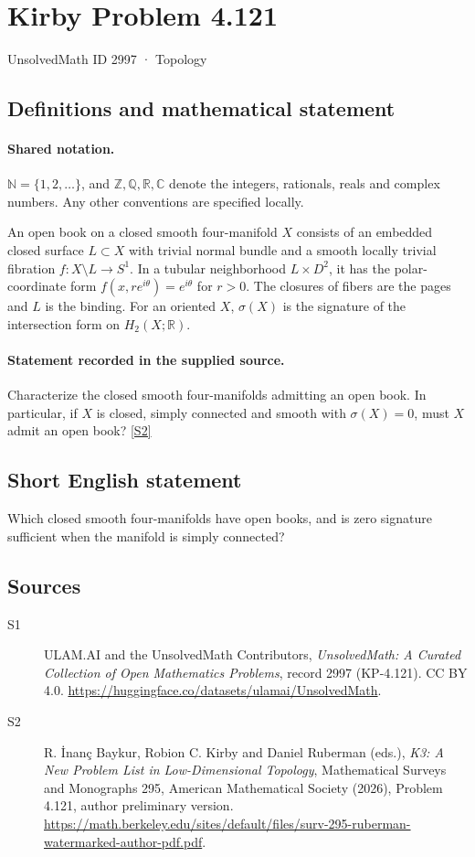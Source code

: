 \documentclass[11pt]{article}
\newcommand{\sref}[2]{\hyperlink{source:#1:#2}{[S#2]}}
\begin{document}
\setcounter{section}{2996}
\section{Kirby Problem 4.121}\label{2997}
{\small\sffamily UnsolvedMath ID 2997 · Topology}
\subsection{Definitions and mathematical statement}

\paragraph{Shared notation.}$\mathbb N=\{1,2,\ldots\}$, and $\mathbb Z,\mathbb Q,\mathbb R,\mathbb C$ denote the integers, rationals, reals and complex numbers. Any other conventions are specified locally.


An open book on a closed smooth four-manifold $X$ consists of an embedded closed surface $L\subset X$ with trivial normal bundle and a smooth locally trivial fibration $f:X\setminus L\to S^1$. In a tubular neighborhood $L\times D^2$, it has the polar-coordinate form $f(x,re^{i\theta})=e^{i\theta}$ for $r>0$. The closures of fibers are the pages and $L$ is the binding. For an oriented $X$, $\sigma(X)$ is the signature of the intersection form on $H_2(X;\mathbb R)$.
\paragraph{Statement recorded in the supplied source.}
Characterize the closed smooth four-manifolds admitting an open book. In particular, if $X$ is closed, simply connected and smooth with $\sigma(X)=0$, must $X$ admit an open book? \sref{2997}{2}
\subsection{Short English statement}
Which closed smooth four-manifolds have open books, and is zero signature sufficient when the manifold is simply connected?
\subsection{Sources}
\begin{description}
\item[\hypertarget{source:2997:1}{S1}] ULAM.AI and the UnsolvedMath Contributors, \emph{UnsolvedMath: A Curated Collection of Open Mathematics Problems}, record 2997 (KP-4.121). CC BY 4.0. \url{https://huggingface.co/datasets/ulamai/UnsolvedMath}.
\item[\hypertarget{source:2997:2}{S2}] R. İnanç Baykur, Robion C. Kirby and Daniel Ruberman (eds.), \emph{K3: A New Problem List in Low-Dimensional Topology}, Mathematical Surveys and Monographs 295, American Mathematical Society (2026), Problem 4.121, author preliminary version. \url{https://math.berkeley.edu/sites/default/files/surv-295-ruberman-watermarked-author-pdf.pdf}.
\end{description}
\label{end:2997}
\end{document}
